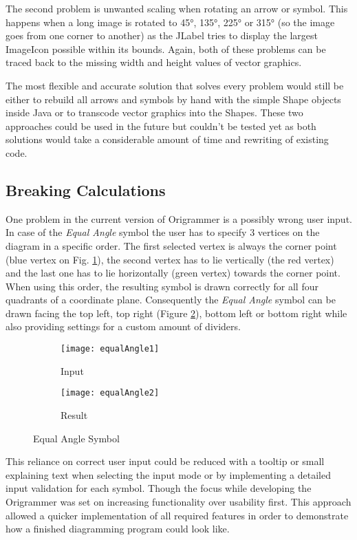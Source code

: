 The second problem is unwanted scaling when rotating an arrow or symbol. This happens when a long image is rotated to 45°, 135°, 225° or 315° (so the image goes from one corner to another) as the JLabel tries to display the largest ImageIcon possible within its bounds. Again, both of these problems can be traced back to the missing width and height values of vector graphics.

The most flexible and accurate solution that solves every problem would still be either to rebuild all arrows and symbols by hand with the simple Shape objects inside Java or to transcode vector graphics into the Shapes. These two approaches could be used in the future but couldn't be tested yet as both solutions would take a considerable amount of time and rewriting of existing code.

\subsection{Breaking Calculations}
\label{sec:breakingCalc}
One problem in the current version of Origrammer is a possibly wrong user input. In case of the \emph{Equal Angle} symbol the user has to specify 3 vertices on the diagram in a specific order. The first selected vertex is always the corner point (blue vertex on Fig. \ref{fig:equalAngle1}), the second vertex has to lie vertically (the red vertex) and the last one has to lie horizontally (green vertex) towards the corner point. When using this order, the resulting symbol is drawn correctly for all four quadrants of a coordinate plane. Consequently the \emph{Equal Angle} symbol can be drawn facing the top left, top right (Figure \ref{fig:equalAngle2}), bottom left or bottom right while also providing settings for a custom amount of dividers.
\begin{figure*}[htbp]
    \centering
    \begin{subfigure}{0.39\textwidth}
        \texttt{[image: equalAngle1]}
        \caption{Input}
        \label{fig:equalAngle1}
    \end{subfigure}
    \begin{subfigure}{0.39\textwidth}
        \texttt{[image: equalAngle2]}
        \caption{Result}
        \label{fig:equalAngle2}
    \end{subfigure}
    \caption{Equal Angle Symbol}
    \label{fig:equalAngleSymbol}
\end{figure*}

\noindent This reliance on correct user input could be reduced with a tooltip or small explaining text when selecting the input mode or by implementing a detailed input validation for each symbol. Though the focus while developing the Origrammer was set on increasing functionality over usability first. This approach allowed a quicker implementation of all required features in order to demonstrate how a finished diagramming program could look like.


